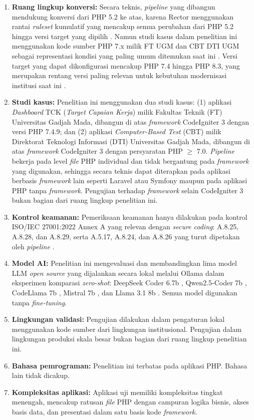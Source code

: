 \begin{enumerate}
	\item \textbf{Ruang lingkup konversi:} Secara teknis, \textit{pipeline} 
yang dibangun mendukung konversi dari PHP 5.2 ke atas, karena Rector 
menggunakan rantai \textit{ruleset} kumulatif yang mencakup semua 
perubahan dari PHP 5.2 hingga versi target yang dipilih 
\cite{rector2024}. Namun studi kasus dalam penelitian ini menggunakan kode sumber PHP 7.x
milik FT UGM dan CBT DTI UGM sebagai representasi kondisi yang paling
umum ditemukan saat ini \cite{w3techs2024php}. Versi target 
yang dapat dikonfigurasi mencakup PHP 7.4 hingga PHP 8.3, yang 
merupakan rentang versi paling relevan untuk kebutuhan modernisasi 
institusi saat ini \cite{phpgroup2022supported}.
	\item \textbf{Studi kasus:} Penelitian ini menggunakan dua studi kasus: (1) aplikasi \textit{Dashboard} TCK (\textit{Target Capaian Kerja}) milik Fakultas Teknik (FT) Universitas Gadjah Mada, dibangun di atas \textit{framework} CodeIgniter 3 dengan versi PHP 7.4.9; dan (2) aplikasi \textit{Computer-Based Test} (CBT) milik Direktorat Teknologi Informasi (DTI) Universitas Gadjah Mada, dibangun di atas \textit{framework} CodeIgniter 3 dengan persyaratan PHP $\geq$ 7.0. \textit{Pipeline} bekerja pada level \textit{file} PHP individual dan tidak bergantung pada \textit{framework} yang digunakan, sehingga secara teknis dapat diterapkan pada aplikasi berbasis \textit{framework} lain seperti Laravel atau Symfony maupun pada aplikasi PHP tanpa \textit{framework}. Pengujian terhadap \textit{framework} selain CodeIgniter 3 bukan bagian dari ruang lingkup penelitian ini.
	\item \textbf{Kontrol keamanan:} Pemeriksaan keamanan hanya dilakukan pada kontrol ISO/IEC 27001:2022 Annex A yang relevan dengan \textit{secure coding}: A.8.25, A.8.28, dan A.8.29, serta A.5.17, A.8.24, dan A.8.26 yang turut dipetakan oleh \textit{pipeline} \cite{iso27001_2022}.
	\item \textbf{Model AI:} Penelitian ini mengevaluasi dan membandingkan lima model LLM \textit{open source} yang dijalankan secara lokal melalui Ollama \cite{ollama2024} dalam eksperimen komparasi \textit{zero-shot}: DeepSeek Coder 6.7b \cite{deepseek2024coder}, Qwen2.5-Coder 7b \cite{hui2024qwen}, CodeLlama 7b \cite{roziere2024codellama}, Mistral 7b \cite{jiang2023mistral}, dan Llama 3.1 8b \cite{dubey2024llama3}. Semua model digunakan tanpa \textit{fine-tuning}.
	\item \textbf{Lingkungan validasi:} Pengujian dilakukan dalam pengaturan lokal menggunakan kode sumber dari lingkungan institusional. Pengujian dalam lingkungan produksi skala besar bukan bagian dari ruang lingkup penelitian ini.
	\item \textbf{Bahasa pemrograman:} Penelitian ini terbatas pada aplikasi PHP. Bahasa lain tidak dicakup.
	\item \textbf{Kompleksitas aplikasi:} Aplikasi uji memiliki 
kompleksitas tingkat menengah, mencakup ratusan \textit{file} PHP 
dengan campuran logika bisnis, akses basis data, dan presentasi 
dalam satu basis kode \textit{framework}.
\end{enumerate}

